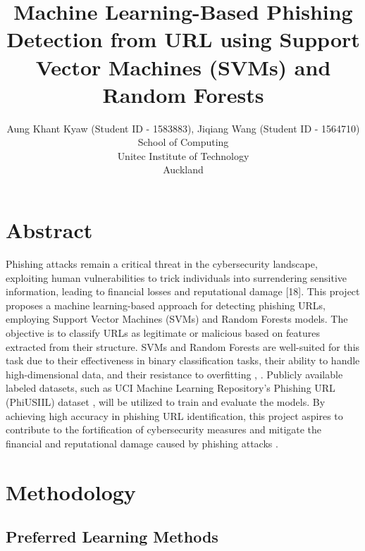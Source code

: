 \documentclass[11pt]{article}
\title{Machine Learning-Based Phishing Detection from URL using Support Vector Machines (SVMs) and Random Forests}
\author{Aung Khant Kyaw (Student ID - 1583883), Jiqiang Wang (Student ID - 1564710)\\
School of Computing \\
Unitec Institute of Technology\\
Auckland
}
\begin{document}
\maketitle


\tableofcontents
\vspace{50pt}

\section{Abstract}
Phishing attacks remain a critical threat in the cybersecurity landscape, exploiting human vulnerabilities to trick individuals into surrendering sensitive information, leading to financial losses and reputational damage [18]. This project proposes a machine learning-based approach for detecting phishing URLs, employing Support Vector Machines (SVMs) and Random Forests models. The objective is to classify URLs as legitimate or malicious based on features extracted from their structure. SVMs and Random Forests are well-suited for this task due to their effectiveness in binary classification tasks, their ability to handle high-dimensional data, and their resistance to overfitting \cite{sahingoz2019}, \cite{9277256}. Publicly available labeled datasets, such as UCI Machine Learning Repository's Phishing URL (PhiUSIIL) dataset \cite{misc_phiusiil_phishing_url_(website)_967}, will be utilized to train and evaluate the models. By achieving high accuracy in phishing URL identification, this project aspires to contribute to the fortification of cybersecurity measures and mitigate the financial and reputational damage caused by phishing attacks \cite{aljofey2022effective}.

\section{Methodology}

\subsection{Preferred Learning Methods}
\end{document}
